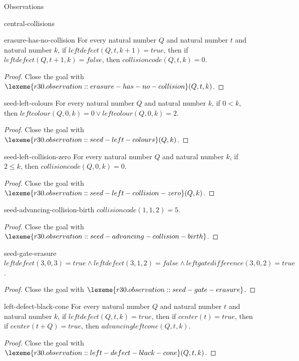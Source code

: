 \begin{lexlean}{Observations}
\begin{section}{central-collisions}
\begin{theorem}{erasure-has-no-collision}
For every natural number \(Q\) and natural number \(t\) and natural number \(k\), if \(leftdefect(Q, t, k + 1) = true\), then if \(leftdefect(Q, t + 1, k) = false\), then \(collisioncode(Q, t, k) = 0\).
\begin{proof}
Close the goal with \(\lexeme{r30.observation::erasure-has-no-collision}(Q, t, k)\).
\end{proof}
\end{theorem}

\begin{theorem}{seed-left-colours}
For every natural number \(Q\) and natural number \(k\), if \(0 < k\), then \(leftcolour(Q, 0, k) = 0 ∨ leftcolour(Q, 0, k) = 2\).
\begin{proof}
Close the goal with \(\lexeme{r30.observation::seed-left-colours}(Q, k)\).
\end{proof}
\end{theorem}

\begin{theorem}{seed-left-collision-zero}
For every natural number \(Q\) and natural number \(k\), if \(2 ≤ k\), then \(collisioncode(Q, 0, k) = 0\).
\begin{proof}
Close the goal with \(\lexeme{r30.observation::seed-left-collision-zero}(Q, k)\).
\end{proof}
\end{theorem}

\begin{theorem}{seed-advancing-collision-birth}
\(collisioncode(1, 1, 2) = 5\).
\begin{proof}
Close the goal with \(\lexeme{r30.observation::seed-advancing-collision-birth}\).
\end{proof}
\end{theorem}

\begin{theorem}{seed-gate-erasure}
\(leftdefect(3, 0, 3) = true ∧ leftdefect(3, 1, 2) = false ∧ leftgatedifference(3, 0, 2) = true\).
\begin{proof}
Close the goal with \(\lexeme{r30.observation::seed-gate-erasure}\).
\end{proof}
\end{theorem}

\begin{theorem}{left-defect-black-cone}
For every natural number \(Q\) and natural number \(t\) and natural number \(k\), if \(leftdefect(Q, t, k) = true\), then if \(center(t) = true\), then if \(center(t + Q) = true\), then \(advancingleftcone(Q, t, k)\).
\begin{proof}
Close the goal with \(\lexeme{r30.observation::left-defect-black-cone}(Q, t, k)\).
\end{proof}
\end{theorem}


\end{section}
\end{lexlean}
